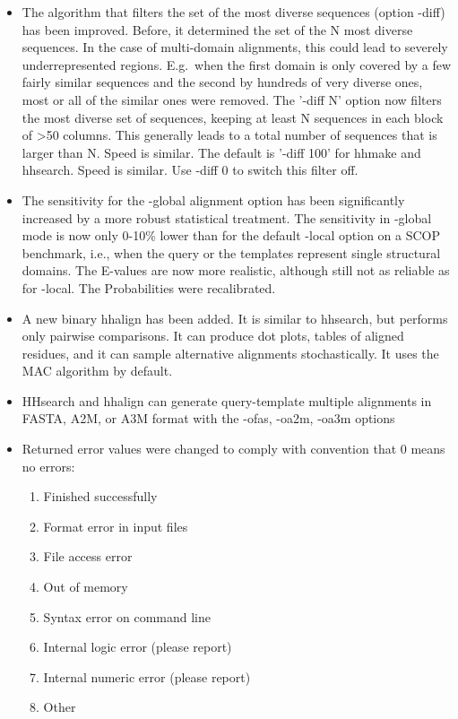 \documentclass[11pt,a4paper]{article}
\begin{document}
\begin{itemize}
\item{The algorithm that filters the set of the most diverse sequences (option 
  -diff) has been improved. Before, it determined the set of the N most 
  diverse sequences. In the case of multi-domain alignments, this could lead 
  to severely underrepresented regions. E.g.\ when the first domain is only 
  covered by a few fairly similar sequences and the second by hundreds of very 
  diverse ones, most or all of the similar ones were removed. The '-diff N' 
  option now filters the most diverse set of sequences, keeping at least N 
  sequences in each block of >50 columns. This generally leads to a total 
  number of sequences that is larger than N. Speed is similar. The default
  is '-diff 100' for hhmake and hhsearch. Speed is similar. Use -diff 0 to 
  switch this filter off.
}
\item{The sensitivity for the -global alignment option has been significantly 
  increased by a more robust statistical treatment. The sensitivity in -global
  mode is now only 0-10\% lower than for the default -local option on a SCOP
  benchmark, i.e., when the query or the templates represent single structural 
  domains. The E-values are now more realistic, although still not as 
  reliable as for -local. The Probabilities were recalibrated.
}
\item{A new binary hhalign has been added. It is similar to hhsearch, but performs
  only pairwise comparisons. It can produce dot plots, tables of aligned 
  residues, and it can sample alternative alignments stochastically. It uses 
  the MAC algorithm by default. 
}
\item{HHsearch and hhalign can generate query-template multiple alignments in 
  FASTA, A2M, or A3M format with the -ofas, -oa2m, -oa3m options 
}
\item{Returned error values were changed to comply with convention that 0 means no errors:
\begin{enumerate}
   \item{Finished successfully}
   \item{Format error in input files}
   \item{File access error}
   \item{Out of memory }
   \item{Syntax error on command line}
   \item{Internal logic error (please report)}
   \item{Internal numeric error (please report)}
   \item{Other}
\end{enumerate}
}	

\end{itemize}
\end{document}
